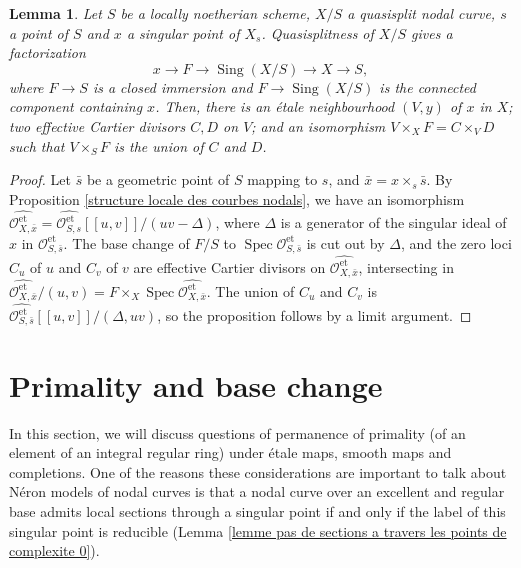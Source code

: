 \documentclass[a4paper,12pt]{amsart} %
\numberwithin{equation}{subsection}
\newcommand{\on}[1]{\operatorname{#1}}
\def\Sing{\operatorname{Sing}}
\newcommand{\Spec}{\operatorname{Spec}}
\theoremstyle{definition}
\theoremstyle{plain}%
\newtheorem{lemma}[definition]{Lemma}
\theoremstyle{remark}
\renewcommand{\O}{\mathcal{O}}
\begin{document}


\begin{lemma}\label{lemma:branches_at_a_singularity_are_Cartier_disjoint}
Let $S$ be a locally noetherian scheme, $X/S$ a quasisplit nodal curve, $s$ a point of $S$ and $x$ a singular point of $X_s$. Quasisplitness of $X/S$ gives a factorization
\[
x \to F \to \Sing(X/S) \to X \to S,
\]
where $F \to S$ is a closed immersion and $F \to \Sing(X/S)$ is the connected component containing $x$. Then, there is an \'etale neighbourhood $(V,y)$ of $x$ in $X$; two effective Cartier divisors $C,D$ on $V$; and an isomorphism $V \times_X F = C \times_V D$ such that $V \times_S F$ is the union of $C$ and $D$.
\end{lemma}

\begin{proof}
Let $\bar s$ be a geometric point of $S$ mapping to $s$, and $\bar x=x\times_s \bar s$. By Proposition \ref{structure locale des courbes nodals}, we have an isomorphism $\widehat{\O_{X,\bar x}^{\on{et}}}=\widehat{\O_{S,s}^{\on{et}}}[[u,v]]/(uv-\Delta)$, where $\Delta$ is a generator of the singular ideal of $x$ in $\O_{S,\bar s}^{\on{et}}$. The base change of $F/S$ to $\Spec\O_{S,\bar s}^{\on{et}}$ is cut out by $\Delta$, and the zero loci $C_u$ of $u$ and $C_v$ of $v$ are effective Cartier divisors on $\widehat{\O_{X,\bar x}^{\on{et}}}$, intersecting in $\widehat{\O_{X,\bar x}^{\on{et}}}/(u,v) = F\times_X \Spec \widehat{\O_{X,\bar x}^{\on{et}}}$. The union of $C_u$ and $C_v$ is $\widehat{\O_{S,\bar s}^{\on{et}}}[[u,v]]/(\Delta, uv)$, so the proposition follows by a limit argument.
\end{proof}

\section{Primality and base change}

In this section, we will discuss questions of permanence of primality (of an element of an integral regular ring) under \'etale maps, smooth maps and completions. One of the reasons these considerations are important to talk about N\'eron models of nodal curves is that a nodal curve over an excellent and regular base admits local sections through a singular point if and only if the label of this singular point is reducible (Lemma \ref{lemme pas de sections a travers les points de complexite 0}).
\end{document}
